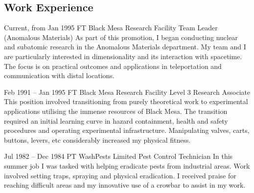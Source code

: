 \documentclass[
    10pt, %
]{FreemanCV}
\begin{document}
\begin{paracol}{2}
\section{Work Experience}





\jobentry
    {Current, from Jan 1995} %
    {FT} %
    {Black Mesa Research Facility} %
    {Team Leader (Anomalous Materials)} %
    {As part of this promotion, I began conducting nuclear and subatomic research in the Anomalous Materials department. My team and I are particularly interested in dimensionality and its interaction with spacetime. The focus is on practical outcomes and applications in teleportation and communication with distal locations.} %


\jobentry
    {Feb 1991 -- Jan 1995} %
    {FT} %
    {Black Mesa Research Facility} %
    {Level 3 Research Associate} %
    {This position involved transitioning from purely theoretical work to experimental applications utilising the immense resources of Black Mesa. The transition required an initial learning curve in hazard containment, health and safety procedures and operating experimental infrastructure. Manipulating valves, carts, buttons, levers, etc considerably increased my physical fitness.} %


\jobentry
    {Jul 1982 -- Dec 1984} %
    {PT} %
    {WashPests Limited} %
    {Pest Control Technician} %
    {In this summer job I was tasked with helping eradicate pests from industrial areas. Work involved setting traps, spraying and physical eradication. I received praise for reaching difficult areas and my innovative use of a crowbar to assist in my work.} %


\end{paracol}
\end{document}
